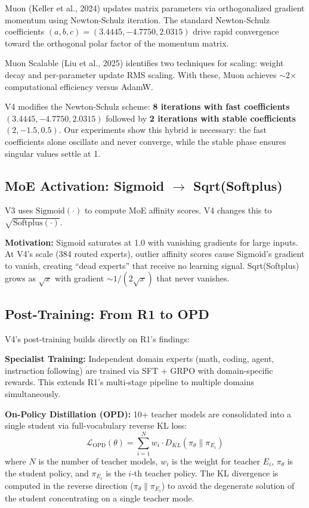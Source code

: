 \documentclass[11pt,a4paper]{article}
\begin{document}
Muon (Keller et al., 2024) updates matrix parameters via orthogonalized gradient momentum using Newton-Schulz iteration. The standard Newton-Schulz coefficients $(a,b,c) = (3.4445, -4.7750, 2.0315)$ drive rapid convergence toward the orthogonal polar factor of the momentum matrix.

Muon Scalable (Liu et al., 2025) identifies two techniques for scaling: weight decay and per-parameter update RMS scaling. With these, Muon achieves $\sim$2$\times$ computational efficiency versus AdamW.

V4 modifies the Newton-Schulz scheme: \textbf{8 iterations with fast coefficients} $(3.4445, -4.7750, 2.0315)$ followed by \textbf{2 iterations with stable coefficients} $(2, -1.5, 0.5)$. Our experiments show this hybrid is necessary: the fast coefficients alone oscillate and never converge, while the stable phase ensures singular values settle at 1.

\subsection{MoE Activation: Sigmoid $\to$ Sqrt(Softplus)}
\label{sec:activation}

V3 uses $\text{Sigmoid}(\cdot)$ to compute MoE affinity scores. V4 changes this to $\sqrt{\text{Softplus}(\cdot)}$.

\textbf{Motivation:} Sigmoid saturates at 1.0 with vanishing gradients for large inputs. At V4's scale (384 routed experts), outlier affinity scores cause Sigmoid's gradient to vanish, creating ``dead experts'' that receive no learning signal. Sqrt(Softplus) grows as $\sqrt{x}$ with gradient $\sim 1/(2\sqrt{x})$ that never vanishes.

\subsection{Post-Training: From R1 to OPD}
\label{sec:post-training}

V4's post-training builds directly on R1's findings:

\textbf{Specialist Training:} Independent domain experts (math, coding, agent, instruction following) are trained via SFT + GRPO with domain-specific rewards. This extends R1's multi-stage pipeline to multiple domains simultaneously.

\textbf{On-Policy Distillation (OPD):} 10+ teacher models are consolidated into a single student via full-vocabulary reverse KL loss:
\begin{equation}
\mathcal{L}_{\text{OPD}}(\theta) = \sum_{i=1}^N w_i \cdot D_{KL}(\pi_\theta \| \pi_{E_i})
\end{equation}
where $N$ is the number of teacher models, $w_i$ is the weight for teacher $E_i$, $\pi_\theta$ is the student policy, and $\pi_{E_i}$ is the $i$-th teacher policy. The KL divergence is computed in the reverse direction ($\pi_\theta \| \pi_{E_i}$) to avoid the degenerate solution of the student concentrating on a single teacher mode.
\end{document}
